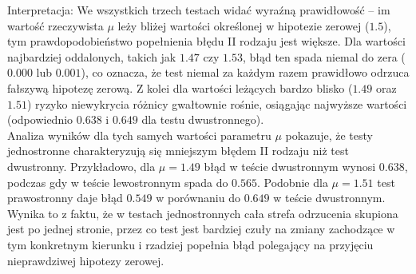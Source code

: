 \documentclass[12pt, a4paper]{article}
\begin{document}
		Interpretacja: We wszystkich trzech testach widać wyraźną prawidłowość – im wartość rzeczywista $\mu$ leży bliżej wartości określonej w hipotezie zerowej ($1.5$), tym prawdopodobieństwo popełnienia błędu II rodzaju jest większe. Dla wartości najbardziej oddalonych, takich jak $1.47$ czy $1.53$, błąd ten spada niemal do zera ($0.000$ lub $0.001$), co oznacza, że test niemal za każdym razem prawidłowo odrzuca fałszywą hipotezę zerową. Z kolei dla wartości leżących bardzo blisko ($1.49$ oraz $1.51$) ryzyko niewykrycia różnicy gwałtownie rośnie, osiągając najwyższe wartości (odpowiednio $0.638$ i $0.649$ dla testu dwustronnego). \\
		
		Analiza wyników dla tych samych wartości parametru $\mu$ pokazuje, że testy jednostronne charakteryzują się mniejszym błędem II rodzaju niż test dwustronny. Przykładowo, dla $\mu = 1.49$ błąd w teście dwustronnym wynosi $0.638$, podczas gdy w teście lewostronnym spada do $0.565$. Podobnie dla $\mu = 1.51$ test prawostronny daje błąd $0.549$ w porównaniu do $0.649$ w teście dwustronnym. Wynika to z faktu, że w testach jednostronnych cała strefa odrzucenia skupiona jest po jednej stronie, przez co test jest bardziej czuły na zmiany zachodzące w tym konkretnym kierunku i rzadziej popełnia błąd polegający na przyjęciu nieprawdziwej hipotezy zerowej. \\
		
\end{document}
